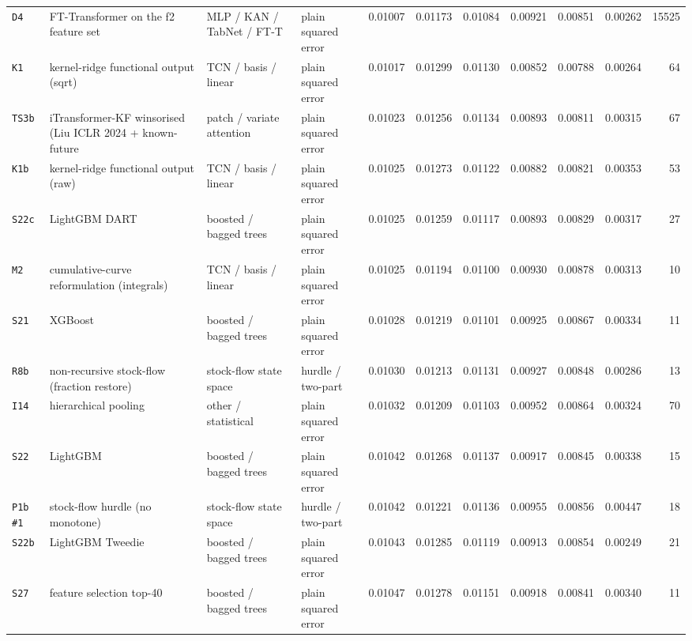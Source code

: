 \documentclass[9pt,landscape]{article}
\begin{document}
\begin{longtable}{@{}p{1.1cm}p{5.4cm}p{3.1cm}p{2.7cm}rrrrrrr@{}}
\texttt{D4} & FT-Transformer on the f2 feature set & MLP / KAN / TabNet / FT-T & plain squared error & 0.01007 & 0.01173 & 0.01084 & 0.00921 & 0.00851 & 0.00262 & 15525 \\
\texttt{K1} & kernel-ridge functional output (sqrt) & TCN / basis / linear & plain squared error & 0.01017 & 0.01299 & 0.01130 & 0.00852 & 0.00788 & 0.00264 & 64 \\
\texttt{TS3b} & iTransformer-KF winsorised (Liu ICLR 2024 + known-future & patch / variate attention & plain squared error & 0.01023 & 0.01256 & 0.01134 & 0.00893 & 0.00811 & 0.00315 & 67 \\
\texttt{K1b} & kernel-ridge functional output (raw) & TCN / basis / linear & plain squared error & 0.01025 & 0.01273 & 0.01122 & 0.00882 & 0.00821 & 0.00353 & 53 \\
\texttt{S22c} & LightGBM DART & boosted / bagged trees & plain squared error & 0.01025 & 0.01259 & 0.01117 & 0.00893 & 0.00829 & 0.00317 & 27 \\
\texttt{M2} & cumulative-curve reformulation (integrals) & TCN / basis / linear & plain squared error & 0.01025 & 0.01194 & 0.01100 & 0.00930 & 0.00878 & 0.00313 & 10 \\
\texttt{S21} & XGBoost & boosted / bagged trees & plain squared error & 0.01028 & 0.01219 & 0.01101 & 0.00925 & 0.00867 & 0.00334 & 11 \\
\texttt{R8b} & non-recursive stock-flow (fraction restore) & stock-flow state space & hurdle / two-part & 0.01030 & 0.01213 & 0.01131 & 0.00927 & 0.00848 & 0.00286 & 13 \\
\texttt{I14} & hierarchical pooling & other / statistical & plain squared error & 0.01032 & 0.01209 & 0.01103 & 0.00952 & 0.00864 & 0.00324 & 70 \\
\texttt{S22} & LightGBM & boosted / bagged trees & plain squared error & 0.01042 & 0.01268 & 0.01137 & 0.00917 & 0.00845 & 0.00338 & 15 \\
\rowcolor{gray!15}\texttt{P1b \#1} & stock-flow hurdle (no monotone) & stock-flow state space & hurdle / two-part & 0.01042 & 0.01221 & 0.01136 & 0.00955 & 0.00856 & 0.00447 & 18 \\
\texttt{S22b} & LightGBM Tweedie & boosted / bagged trees & plain squared error & 0.01043 & 0.01285 & 0.01119 & 0.00913 & 0.00854 & 0.00249 & 21 \\
\texttt{S27} & feature selection top-40 & boosted / bagged trees & plain squared error & 0.01047 & 0.01278 & 0.01151 & 0.00918 & 0.00841 & 0.00340 & 11 \\

\end{longtable}
\end{document}
